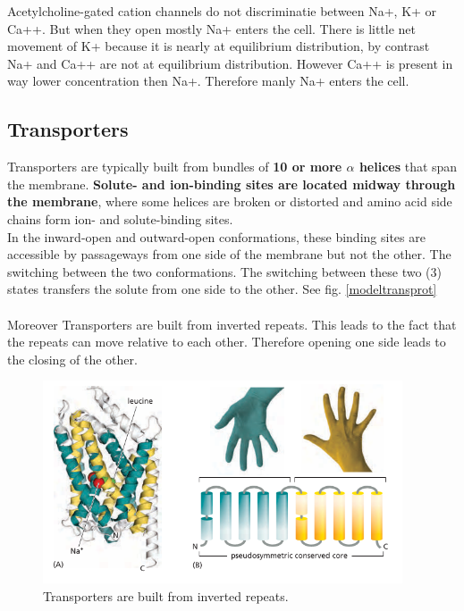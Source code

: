 \documentclass[../main.tex]{subfiles}
\begin{document}
\begin{ExWithTitle}{Acetylcholine-gated cation channels do not discriminatie between Na+, K+ or Ca++. But when they open mostly Na+ enters the cell.}
	There is little net movement of K+ because it is nearly at equilibrium distribution, by contrast Na+  and Ca++ are not at equilibrium distribution. However Ca++ is present in way lower concentration then Na+. Therefore manly Na+ enters the cell. 
\end{ExWithTitle}



\subsection{Transporters}
Transporters are typically built from bundles of \textbf{10 or more $\alpha$ helices} that span the membrane. \textbf{Solute- and ion-binding sites are located midway through the membrane}, where some helices are broken or distorted and amino acid side chains form ion- and solute-binding sites. \\
In the inward-open and outward-open conformations, these binding sites are accessible by passageways from one side of the membrane but not the other. The switching between the two conformations. The switching between these two (3) states transfers the solute from one side to the other. See fig. \ref{modeltransprot}\\
\\
Moreover Transporters are built from inverted repeats. This leads to the fact that the repeats can move relative to each other. Therefore opening one side leads to the closing of the other. 

\begin{figure}[H]
	\centering
	\includegraphics[height = 6cm]{8}
	\caption{Transporters are built from inverted repeats.}
\end{figure}
\end{document}
